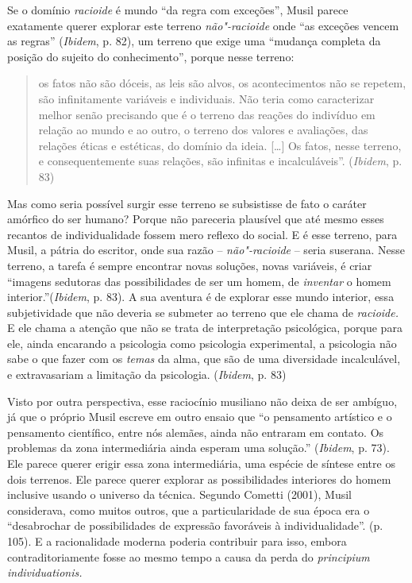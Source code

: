 Se o domínio \emph{racioide} é mundo ``da regra com exceções'', Musil
parece exatamente querer explorar este terreno \emph{não"-racioide} onde
``as exceções vencem as regras'' (\emph{Ibidem}, p. 82), um terreno que
exige uma ``mudança completa da posição do sujeito do conhecimento'',
porque nesse terreno:

\begin{quote}
os fatos não são dóceis, as leis são alvos, os acontecimentos não se
repetem, são infinitamente variáveis e individuais. Não teria como
caracterizar melhor senão precisando que é o terreno das reações do
indivíduo em relação ao mundo e ao outro, o terreno dos valores e
avaliações, das relações éticas e estéticas, do domínio da ideia.
[\ldots{}] Os fatos, nesse terreno, e consequentemente suas relações, são
infinitas e incalculáveis''. (\emph{Ibidem}, p. 83)
\end{quote}

Mas como seria possível surgir esse terreno se subsistisse de fato o
caráter amórfico do ser humano? Porque não pareceria plausível que até
mesmo esses recantos de individualidade fossem mero reflexo do social. E
é esse terreno, para Musil, a pátria do escritor, onde sua razão --
\emph{não"-racioide} -- seria suserana. Nesse terreno, a tarefa é sempre
encontrar novas soluções, novas variáveis, é criar ``imagens sedutoras
das possibilidades de ser um homem, de \emph{inventar} o homem
interior.''(\emph{Ibidem}, p. 83). A sua aventura é de explorar esse
mundo interior, essa subjetividade que não deveria se submeter ao
terreno que ele chama de \emph{racioide.} E ele chama a atenção que não
se trata de interpretação psicológica, porque para ele, ainda encarando
a psicologia como psicologia experimental, a psicologia não sabe o que
fazer com os \emph{temas} da alma, que são de uma diversidade
incalculável, e extravasariam a limitação da psicologia. (\emph{Ibidem},
p. 83)

Visto por outra perspectiva, esse raciocínio musiliano não deixa de ser
ambíguo, já que o próprio Musil escreve em outro ensaio que ``o
pensamento artístico e o pensamento científico, entre nós alemães, ainda
não entraram em contato. Os problemas da zona intermediária ainda
esperam uma solução.'' (\emph{Ibidem}, p. 73). Ele parece querer erigir
essa zona intermediária, uma espécie de síntese entre os dois terrenos.
Ele parece querer explorar as possibilidades interiores do homem
inclusive usando o universo da técnica. Segundo Cometti (2001), Musil
considerava, como muitos outros, que a particularidade de sua época era
o ``desabrochar de possibilidades de expressão favoráveis à
individualidade''. (p. 105). E a racionalidade moderna poderia
contribuir para isso, embora contraditoriamente fosse ao mesmo tempo a
causa da perda do \emph{principium} \emph{individuationis.}

